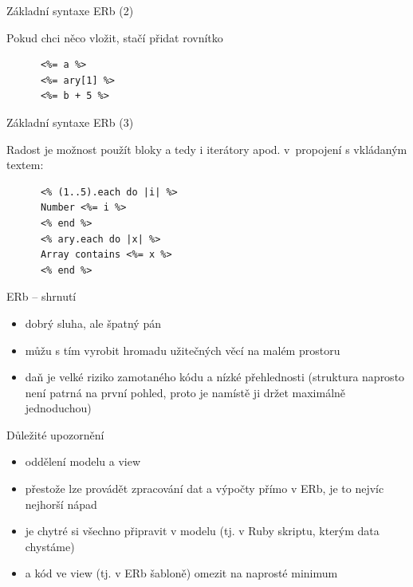 \documentclass{beamer}
\begin{document}
\begin{frame}[fragile]{Základní syntaxe ERb (2)}
  \begin{block}{ }
    Pokud chci něco vložit, stačí přidat rovnítko
    \scriptsize
    \begin{verbatim}
      <%= a %>
      <%= ary[1] %>
      <%= b + 5 %>
    \end{verbatim}
  \end{block}
\end{frame}

\begin{frame}[fragile]{Základní syntaxe ERb (3)}
  \begin{block}{ }
    Radost je možnost použít bloky a tedy i iterátory apod. v~propojení s vkládaným textem:
    \scriptsize
    \begin{verbatim}
      <% (1..5).each do |i| %>
      Number <%= i %>
      <% end %>
      <% ary.each do |x| %>
      Array contains <%= x %>
      <% end %>
    \end{verbatim}
  \end{block}
\end{frame}

\begin{frame}{ERb -- shrnutí}
  \begin{itemize}
    \item dobrý sluha, ale špatný pán
    \item můžu s tím vyrobit hromadu užitečných věcí na malém prostoru
    \item daň je velké riziko zamotaného kódu a nízké přehlednosti (struktura naprosto není patrná na první pohled, proto je namístě ji držet maximálně jednoduchou)
  \end{itemize}
\end{frame}

\begin{frame}{Důležité upozornění}
  \begin{itemize}
    \item oddělení modelu a view
    \item přestože lze provádět zpracování dat a výpočty přímo v ERb, je to nejvíc nejhorší nápad
    \item je chytré si všechno připravit v modelu (tj. v Ruby skriptu, kterým data chystáme)
    \item a kód ve view (tj. v ERb šabloně) omezit na naprosté minimum
  \end{itemize}
\end{frame}
\end{document}
